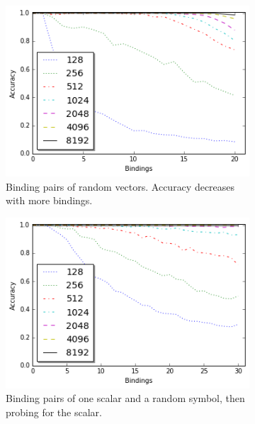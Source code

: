 \documentclass[journal]{journal}
\begin{document}
		\begin{figure}[th!]
			\begin{subfigure}{0.45\columnwidth}
				\center
				\includegraphics[width=1\columnwidth]{img/capacity.png}
				\caption{Binding pairs of random vectors. Accuracy decreases with more bindings.}
				\label{fig:capacity}
			\end{subfigure}
			\begin{subfigure}{0.45\columnwidth}
				\center
				\includegraphics[width=1\columnwidth]{img/capacity_scalar_30.png}
				\caption{Binding pairs of one scalar and a random symbol, then probing for the scalar.}
				\label{fig:capacity_scalar}
			\end{subfigure}	
			\center
			\begin{subfigure}{0.45\columnwidth}
				\center

\end{subfigure}
\end{figure}
\end{document}
